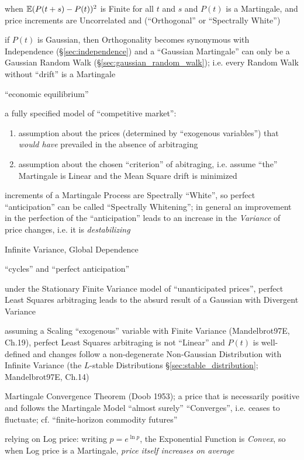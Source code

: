 when $\mathbb{E}(P(t + s) - P(t))^2$ is Finite for all $t$ and $s$ and $P(t)$ is a
Martingale, and price increments are Uncorrelated and (``Orthogonal'' or
``Spectrally White'')

if $P(t)$ is Gaussian, then Orthogonality becomes synonymous with Independence
(\S\ref{sec:independence}) and a ``Gaussian Martingale'' can only be a Gaussian
Random Walk (\S\ref{sec:gaussian_random_walk}); i.e. every Random Walk without
``drift'' is a Martingale

``economic equilibrium''

a fully specified model of ``competitive market'':
\begin{enumerate}
  \item assumption about the prices (determined by ``exogenous variables'') that
    \emph{would have} prevailed in the absence of arbitraging
  \item assumption about the chosen ``criterion'' of abitraging, i.e. assume
    ``the'' Martingale is Linear and the Mean Square drift is minimized
\end{enumerate}

increments of a Martingale Process are Spectrally ``White'', so perfect
``anticipation'' can be called ``Spectrally Whitening''; in general an
improvement in the perfection of the ``anticipation'' leads to an increase in
the \emph{Variance} of price changes, i.e. it is \emph{destabilizing}

Infinite Variance, Global Dependence

``cycles'' and ``perfect anticipation''

under the Stationary Finite Variance model of ``unanticipated prices'', perfect
Least Squares arbitraging leads to the absurd result of a Gaussian with
Divergent Variance

assuming a Scaling ``exogenous'' variable with Finite Variance (Mandelbrot97E,
Ch.19), perfect Least Squares arbitraging is not ``Linear'' and $P(t)$ is
well-defined and changes follow a non-degenerate Non-Gaussian Distribution with
Infinite Variance (the $L$-stable Distributions \S\ref{sec:stable_distribution};
Mandelbrot97E, Ch.14)

Martingale Convergence Theorem (Doob 1953); a price that is necessarily positive
and follows the Martingale Model ``almost surely'' ``Converges'', i.e. ceases to
fluctuate; cf. ``finite-horizon commodity futures''

relying on Log price: writing $p = e^{\ln p}$, the Exponential Function is
\emph{Convex}, so when Log price is a Martingale, \emph{price itself increases
on average}

